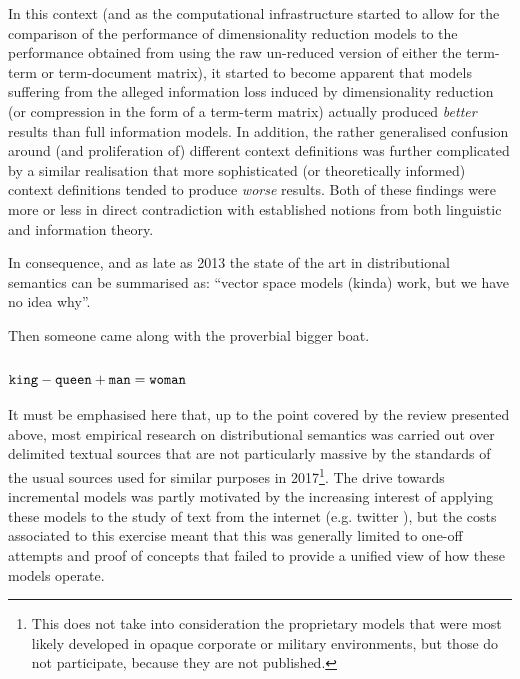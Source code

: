 In this context (and as the computational infrastructure started to allow for the comparison of the performance of dimensionality reduction models to the performance obtained from using the raw un-reduced version of either the term-term or term-document matrix), it started to become apparent that models suffering from the alleged information loss induced by dimensionality reduction (or compression in the form of a term-term matrix) actually produced \emph{better} results than full information models.
In addition, the rather generalised confusion around (and proliferation of) different context definitions was further complicated by a similar realisation that more sophisticated (or theoretically informed) context definitions tended to produce \emph{worse} results.
Both of these findings were more or less in direct contradiction with established notions from both linguistic and information theory.

In consequence, and as late as 2013 the state of the art in distributional semantics can be summarised as: ``vector space models (kinda) work, but we have no idea why''.

Then someone came along with the proverbial bigger boat.

\subsection{$\texttt{king} - \texttt{queen} + \texttt{man} = \texttt{woman}$}

It must be emphasised here that, up to the point covered by the review presented above, most empirical research on distributional semantics was carried out over delimited textual sources that are not particularly massive by the standards of the usual sources used for similar purposes in 2017\footnote{
    This does not take into consideration the proprietary models that were most likely developed in opaque corporate or military environments, but those do not participate, because they are not published.
}.
The drive towards incremental models was partly motivated by the increasing interest of applying these models to the study of text from the internet (e.g. twitter \citep{deboom2015}), but the costs associated to this exercise meant that this was generally limited to one-off attempts and proof of concepts that failed to provide a unified view of how these models operate.


